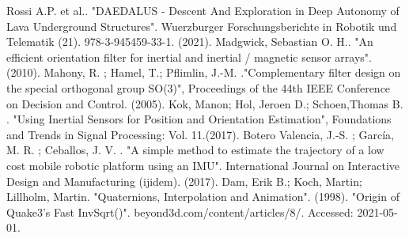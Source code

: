 \documentclass[letterpaper, 10 pt, conference]{ieeeconf}  %
\begin{document}










\begin{thebibliography}{99}
 Rossi A.P. et al.. "DAEDALUS - Descent And Exploration in Deep Autonomy of Lava Underground Structures". Wuerzburger Forschungsberichte in Robotik und Telematik (21). 978-3-945459-33-1. (2021).
 Madgwick, Sebastian O. H.. "An efficient orientation filter for inertial and inertial / magnetic sensor arrays". (2010).
Mahony, R. ; Hamel, T.; Pflimlin, J.-M. ."Complementary filter design on the special orthogonal group SO(3)", Proceedings of the 44th IEEE Conference on Decision and Control. (2005).
 Kok, Manon; Hol, Jeroen D.;  Schoen,Thomas B. .  "Using Inertial Sensors for Position and Orientation Estimation", Foundations and Trends in Signal Processing: Vol. 11.(2017).
 Botero Valencia, J.-S. ; Garc{\'i}a, M. R. ; Ceballos, J. V. . "A simple method to estimate the trajectory of a low cost mobile robotic platform using an IMU". International Journal on Interactive Design and Manufacturing (ijidem). (2017).
Dam, Erik B.; Koch, Martin;  Lillholm, Martin. "Quaternions, Interpolation and Animation". (1998).
"Origin of Quake3's Fast InvSqrt()". beyond3d.com/content/articles/8/. Accessed: 2021-05-01.




\end{thebibliography}
\end{document}
